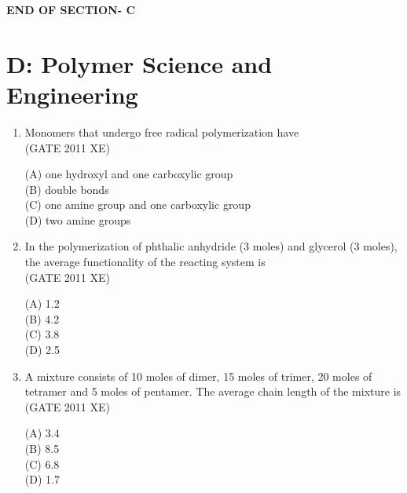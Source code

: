 \documentclass[journal,12pt,onecolumn]{IEEEtran}
\begin{document}
\vspace{3\baselineskip}
    \begin{center}
    \textbf{\Large END OF SECTION- C}
    \end{center}

\newpage

\section*{D: Polymer Science and Engineering}
\bigskip
\begin{enumerate}[label=\arabic*)]

\item Monomers that undergo free radical polymerization have\\

\hfill{(GATE 2011 XE)} \\
\begin{multicols}{2}
(A) one hydroxyl and one carboxylic group\\
(B) double bonds\\
(C) one amine group and one carboxylic group\\
(D) two amine groups
\end{multicols}

\item In the polymerization of phthalic anhydride (3 moles) and glycerol (3 moles), the average functionality of the reacting system is\\

\hfill{(GATE 2011 XE)} \\
\begin{multicols}{4}
(A) 1.2\\
(B) 4.2\\
(C) 3.8\\
(D) 2.5
\end{multicols}

\item A mixture consists of 10 moles of dimer, 15 moles of trimer, 20 moles of tetramer and 5 moles of pentamer. The average chain length of the mixture is\\

\hfill{(GATE 2011 XE)} \\
\begin{multicols}{4}
(A) 3.4\\
(B) 8.5\\
(C) 6.8\\
(D) 1.7
\end{multicols}



\end{enumerate}
\end{document}
